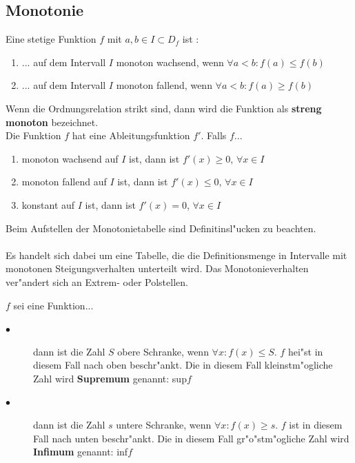\subsection{Monotonie}

\begin{Definition}
Eine stetige Funktion $f$ mit $a,b\in I \subset D_{f}$ ist :\\
\begin{enumerate}
\item ... auf dem Intervall $I$ monoton wachsend, wenn $\forall a < b: f(a)\leq f(b)$
\item ... auf dem Intervall $I$ monoton fallend, wenn $\forall a < b: f(a) \geq f(b)$ \\
\end{enumerate}
Wenn die Ordnungsrelation strikt sind, dann wird die Funktion als \textbf{streng monoton} bezeichnet.\\
Die Funktion $f$ hat eine Ableitungsfunktion $f'$. Falls $f$...
\begin{enumerate}
\item monoton wachsend auf $I$ ist, dann ist $f'(x)\geq0$, \quad $\forall x \in I$
\item monoton fallend auf $I$ ist, dann ist $f'(x)\leq0$, \quad $\forall x \in I$
\item konstant auf $I$ ist, dann ist $f'(x)=0$, \quad $\forall x \in I$
\end{enumerate}
Beim Aufstellen der Monotonietabelle sind Definitinsl"ucken zu beachten.\\
\\
Es handelt sich dabei um eine Tabelle, die die Definitionsmenge in Intervalle mit monotonen Steigungsverhalten unterteilt wird. Das Monotonieverhalten ver"andert sich an Extrem- oder Polstellen.\\
\end{Definition}
\begin{Bemerkung}
$f$ sei eine Funktion...
\begin{description}
\item[$\bullet$] dann ist die Zahl $S$ obere Schranke, wenn $\forall x : f(x)\leq S$. $f$ hei"st in diesem Fall nach oben beschr"ankt. Die in diesem Fall kleinstm"ogliche Zahl wird \textbf{Supremum} genannt: sup$f$
\item[$\bullet$] dann ist die Zahl $s$ untere Schranke, wenn $\forall x : f(x) \geq s$. $f$ ist in diesem Fall nach unten beschr"ankt. Die in diesem Fall gr"o"stm"ogliche Zahl wird \textbf{Infimum} genannt: inf$f$
\end{description}
\end{Bemerkung}


